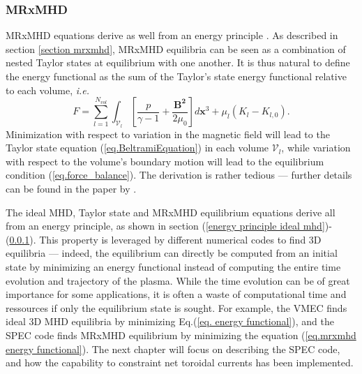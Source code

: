 \documentclass[my_thesis.tex]{subfiles}
\begin{document}
\subsubsection{MRxMHD} \label{energy principle mrxmhd}
MRxMHD equations derive as well from an energy principle \citep{Dewar2015}. As described in section \ref{section mrxmhd}, MRxMHD equilibria can be seen as a combination of nested Taylor states at equilibrium with one another. It is thus natural to define the energy functional as the sum of the Taylor's state energy functional relative to each volume, \textit{i.e.}
\begin{equation}
	F = \sum_{l=1}^{N_{vol}} \int_{\mathcal{V}_l} \left[\frac{p}{\gamma-1}+\frac{\mathbf{B^2}}{2\mu_0}\right]d\mathbf{x}^3 + \mu_l(K_l-K_{l,0}). \label{eq.mrxmhd energy functional}
\end{equation}
Minimization with respect to variation in the magnetic field will lead to the Taylor state equation (\ref{eq.BeltramiEquation}) in each volume $\mathcal{V}_l$, while variation with respect to the volume's boundary motion will lead to the equilibrium condition (\ref{eq.force_balance}). The derivation is rather tedious --- further details can be found in the paper by \citet{Dewar2015}.

The ideal MHD, Taylor state and MRxMHD equilibrium equations derive all from an energy principle, as shown in section (\ref{energy principle ideal mhd})-(\ref{energy principle mrxmhd}). This property is leveraged by different numerical codes to find 3D equilibria --- indeed, the equilibrium can directly be computed from an initial state by minimizing an energy functional instead of computing the entire time evolution and trajectory of the plasma. While the time evolution can be of great importance for some applications, it is often a waste of computational time and ressources if only the equilibrium state is sought. For example, the \ac{VMEC} \citep{Hirshman1983,Hirshman1986} finds ideal 3D MHD equilibria by minimizing Eq.(\ref{eq. energy functional}), and the \ac{SPEC} code \citep{hudsonComputationMultiregionRelaxed2012,Hudson2020c} finds MRxMHD equilibrium by minimizing the equation (\ref{eq.mrxmhd energy functional}). The next chapter will focus on describing the \ac{SPEC} code, and how the capability to constraint net toroidal currents has been implemented.




\end{document}
